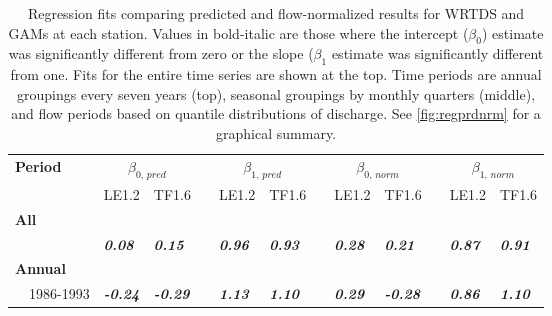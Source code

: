 \documentclass[letterpaper,12pt,oneside]{article}\usepackage[]{graphicx}\usepackage[]{color}
\begin{document}
\begin{table}[!tbp]
\caption{Regression fits comparing predicted and flow-normalized results for \ac{WRTDS} and \acp{GAM} at each station.  Values in bold-italic are those where the intercept ($\beta_0$) estimate was significantly different from zero or the slope ($\beta_{1}$ estimate was significantly different from one. Fits for the entire time series are shown at the top.  Time periods are annual groupings every seven years (top), seasonal groupings by monthly quarters (middle), and flow periods based on quantile distributions of discharge.  See \cref{fig:regprdnrm} for a graphical summary.\label{tab:redprdnrm}} 
\begin{center}
\begin{tabular}{lllcllcllcll}
\hline\hline
\multicolumn{1}{l}{\bfseries Period}&\multicolumn{2}{c}{\bfseries $\beta_{0,\,pred}$}&\multicolumn{1}{c}{\bfseries }&\multicolumn{2}{c}{\bfseries $\beta_{1,\,pred}$}&\multicolumn{1}{c}{\bfseries }&\multicolumn{2}{c}{\bfseries $\beta_{0,\,norm}$}&\multicolumn{1}{c}{\bfseries }&\multicolumn{2}{c}{\bfseries $\beta_{1,\,norm}$}\tabularnewline
\cline{2-3} \cline{5-6} \cline{8-9} \cline{11-12}
\multicolumn{1}{l}{}&\multicolumn{1}{c}{LE1.2}&\multicolumn{1}{c}{TF1.6}&\multicolumn{1}{c}{}&\multicolumn{1}{c}{LE1.2}&\multicolumn{1}{c}{TF1.6}&\multicolumn{1}{c}{}&\multicolumn{1}{c}{LE1.2}&\multicolumn{1}{c}{TF1.6}&\multicolumn{1}{c}{}&\multicolumn{1}{c}{LE1.2}&\multicolumn{1}{c}{TF1.6}\tabularnewline
\hline
{\bfseries All}&&&&&&&&&&&\tabularnewline
~~&{\bf \textit{0.08}}&{\bf \textit{0.15}}&&{\bf \textit{0.96}}&{\bf \textit{0.93}}&&{\bf \textit{0.28}}&{\bf \textit{0.21}}&&{\bf \textit{0.87}}&{\bf \textit{0.91}}\tabularnewline
\hline
{\bfseries Annual}&&&&&&&&&&&\tabularnewline
~~1986-1993&{\bf \textit{-0.24}}&{\bf \textit{-0.29}}&&{\bf \textit{1.13}}&{\bf \textit{1.10}}&&{\bf \textit{0.29}}&{\bf \textit{-0.28}}&&{\bf \textit{0.86}}&{\bf \textit{1.10}}\tabularnewline

\end{tabular}
\end{center}
\end{table}
\end{document}
